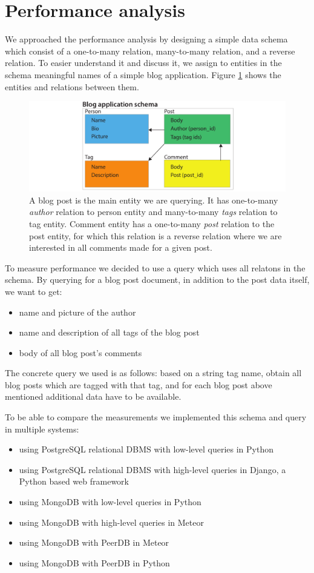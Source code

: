 \section{Performance analysis}

We approached the performance analysis by designing a simple data schema which consist of a one-to-many relation, many-to-many relation, and a reverse relation.
To easier understand it and discuss it, we assign to entities in the schema meaningful names of a simple blog application.
Figure \ref{schema} shows the entities and relations between them.

\begin{figure}[!h]
\centering
\includegraphics[width=0.9\columnwidth]{schema}
\caption{A blog post is the main entity we are querying. It has one-to-many \emph{author} relation to person entity and many-to-many \emph{tags} relation to tag entity. Comment entity has a one-to-many \emph{post} relation to the post entity, for which this relation is a reverse relation where we are interested in all comments made for a given post.}
\label{schema}
\end{figure}

To measure performance we decided to use a query which uses all relatons in the schema.
By querying for a blog post document, in addition to the post data itself, we want to get:
\begin{itemize}
\item name and picture of the author
\item name and description of all tags of the blog post
\item body of all blog post's comments
\end{itemize}

The concrete query we used is as follows: based on a string tag name, obtain all blog posts which are tagged with that tag, and for each blog post above mentioned additional data have to be available.

To be able to compare the measurements we implemented this schema and query in multiple systems:
\begin{itemize}
\item using PostgreSQL relational DBMS with low-level queries in Python
\item using PostgreSQL relational DBMS with high-level queries in Django, a Python based web framework
\item using MongoDB with low-level queries in Python
\item using MongoDB with high-level queries in Meteor
\item using MongoDB with PeerDB in Meteor
\item using MongoDB with PeerDB in Python
\end{itemize}

